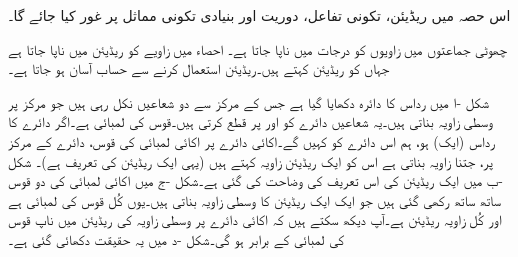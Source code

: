 اس حصہ میں ریڈیئن، تکونی تفاعل، دوریت اور بنیادی تکونی مماثل پر غور کیا جائے گا۔ 

چھوٹی جماعتوں میں زاویوں کو درجات  میں ناپا جاتا ہے۔ احصاء میں زاویے  کو ریڈیئن میں ناپا جاتا ہے جہاں  کو  ریڈیئن کہتے ہیں۔ریڈیئن  استعمال  کرنے سے حساب آسان ہو جاتا ہے۔

شکل -ا میں رداس  کا دائرہ دکھایا گیا ہے جس کے مرکز  سے دو شعاعیں نکل رہی ہیں جو مرکز پر وسطی زاویہ  بناتی ہیں۔یہ شعاعیں دائرے کو  اور  پر قطع کرتی ہیں۔قوس  کی لمبائی  ہے۔اگر دائرے کا رداس   (ایک) ہو،  ہم اس دائرے کو   کہیں گے۔اکائی دائرے پر اکائی لمبائی کی قوس، دائرے کے مرکز پر،  جتنا زاویہ بناتی ہے اس کو ایک ریڈیئن زاویہ کہتے ہیں (یہی ایک ریڈیئن کی تعریف ہے)۔ شکل -ب میں ایک ریڈیئن کی اس تعریف کی وضاحت کی گئی ہے۔شکل -ج میں اکائی لمبائی کی  دو قوس ساتھ ساتھ رکھی  گئی ہیں جو ایک ایک ریڈیئن کا وسطی زاویہ بناتی  ہیں۔یوں کُل قوس کی لمبائی  ہے اور کُل زاویہ  ریڈیئن ہے۔آپ دیکھ سکتے ہیں کہ اکائی دائرے پر وسطی زاویہ کی ریڈیئن میں ناپ قوس کی لمبائی کے برابر ہو گی۔شکل -د میں یہ  حقیقت دکھائی گئی ہے۔
